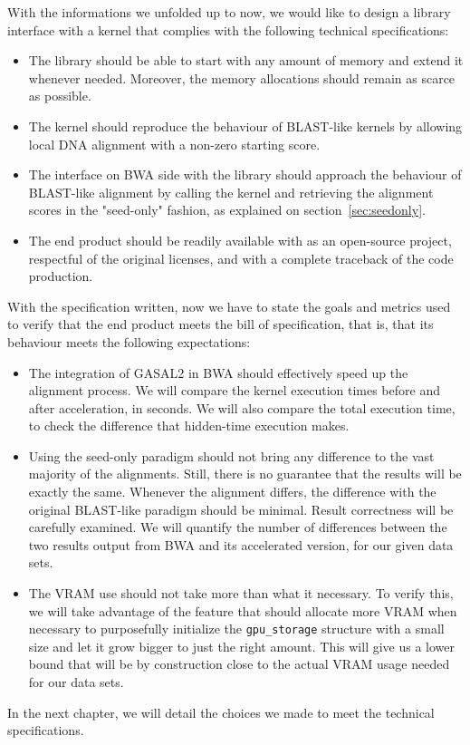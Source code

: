 With the informations we unfolded up to now, we would like to design a library interface with a kernel that complies with the following technical specifications:

\begin{itemize}
	\item The library should be able to start with any amount of memory and extend it whenever needed. Moreover, the memory allocations should remain as scarce as possible.
	\item The kernel should reproduce the behaviour of BLAST-like kernels by allowing local DNA alignment with a non-zero starting score.
	\item The interface on BWA side with the library should approach the behaviour of BLAST-like alignment by calling the kernel and retrieving the alignment scores in the "seed-only" fashion, as explained on section~\ref{sec:seedonly}.
	\item The end product should be readily available with as an open-source project, respectful of the original licenses, and with a complete traceback of the code production.
\end{itemize}

With the specification written, now we have to state the goals and metrics used to verify that the end product meets the bill of specification, that is, that its behaviour meets the following expectations: 

\begin{itemize}
	\item The integration of GASAL2 in BWA should effectively speed up the alignment process. We will compare the kernel execution times before and after acceleration, in seconds. We will also compare the total execution time, to check the difference that hidden-time execution makes.
	
	\item Using the seed-only paradigm should not bring any difference to the vast majority of the alignments. Still, there is no guarantee that the results will be exactly the same. Whenever the alignment differs, the difference with the original BLAST-like paradigm should be minimal. Result correctness will be carefully examined. We will quantify the number of differences between the two results output from BWA and its accelerated version, for our given data sets.
	
	\item The VRAM use should not take more than what it necessary. To verify this, we will take advantage of the feature that should allocate more VRAM when necessary to purposefully initialize the \verb|gpu_storage| structure with a small size and let it grow bigger to just the right amount. This will give us a lower bound that will be by construction close to the actual VRAM usage needed for our data sets.
	
\end{itemize}

In the next chapter, we will detail the choices we made to meet the technical specifications.